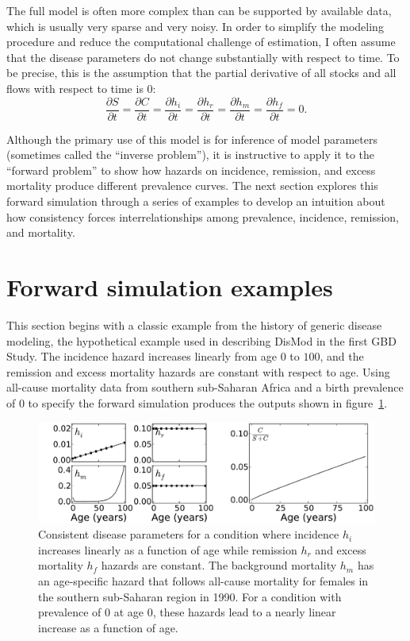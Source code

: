 The full model is often more complex than can be supported by
available data, which is usually very sparse and very noisy.  In order
to simplify the modeling procedure and reduce the computational challenge
of estimation, I often assume that the disease parameters do not change
substantially with respect to time. To be precise, this is the assumption
that the partial derivative of all stocks and all flows with respect
to time is $0$:
\[
\frac{\partial S}{\partial t}
=
\frac{\partial C}{\partial t}
=
\frac{\partial h_i}{\partial t}
=
\frac{\partial h_r}{\partial t}
=
\frac{\partial h_m}{\partial t}
=
\frac{\partial h_f}{\partial t}
=
0.
\]

Although the primary use of this model is for inference of model
parameters (sometimes called the ``inverse problem''), it is
instructive to apply it to the ``forward problem'' to show how hazards on incidence,
remission, and excess mortality produce different prevalence
curves. The next section explores this forward simulation through a
series of examples to develop an intuition about how consistency
forces interrelationships among prevalence, incidence, remission,
and mortality.


\section{Forward simulation examples}

This section begins with a classic example from the history of generic
disease modeling, the hypothetical example used in describing DisMod
in the first GBD Study.\cite{murray_global_1996}
The incidence hazard increases linearly from age $0$ to
$100$, and the remission and excess mortality hazards are constant with
respect to age.  Using all-cause mortality data from southern sub-Saharan
Africa and a birth prevalence of $0$ to specify
the forward simulation produces the outputs shown in
figure~\ref{forward-sim-ex1}.

\begin{figure}[htb]
\begin{center}
\includegraphics[width=\textwidth]{initial.pdf}
\caption{Consistent disease parameters for a condition where incidence
  $h_i$ increases linearly as a function of age while remission
  $h_r$ and excess mortality $h_f$ hazards are constant. The
  background mortality $h_m$ has an age-specific hazard that follows
  all-cause mortality for females in the southern sub-Saharan region
  in 1990. For a condition with prevalence of $0$ at age $0$, these
  hazards lead to a nearly linear increase as a function of age.}
\label{forward-sim-ex1}
\end{center}
\end{figure}

